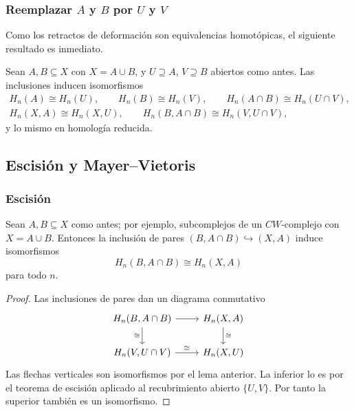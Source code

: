 \begin{frame}[allowframebreaks]
  \frametitle{Reemplazar $A$ y $B$ por $U$ y $V$}

  Como los retractos de deformación son equivalencias homotópicas, el siguiente resultado es inmediato.

  \begin{lemma}
    Sean $A,B\subseteq X$ con $X=A\cup B$, y $U\supseteq A$, $V\supseteq B$
    abiertos como antes. Las inclusiones inducen isomorfismos
    \begin{gather*}
      H_n(A)\cong H_n(U),\qquad H_n(B)\cong H_n(V),\qquad
      H_n(A\cap B)\cong H_n(U\cap V),\\
      H_n(X,A)\cong H_n(X,U),\qquad H_n(B,A\cap B)\cong H_n(V,U\cap V),
    \end{gather*}
    y lo mismo en homología reducida.
  \end{lemma}

\end{frame}

\subsection{Escisión y Mayer--Vietoris}

\begin{frame}[allowframebreaks]
  \frametitle{Escisión}

  \begin{theorem}
    Sean $A,B\subseteq X$ como antes; por ejemplo, subcomplejos de un
    $CW$-complejo con $X=A\cup B$. Entonces la inclusión de pares
    $(B,A\cap B)\hookrightarrow(X,A)$ induce isomorfismos
    \[
      H_n(B,A\cap B)\cong H_n(X,A)
    \]
    para todo $n$.
  \end{theorem}

  \framebreak

  \begin{proof}
    Las inclusiones de pares dan un diagrama conmutativo
    \[
      \begin{tikzcd}[ampersand replacement=\&]
        H_n(B,A\cap B)\arrow[r]\arrow{d}[swap]{\cong}
          \&H_n(X,A)\arrow{d}{\cong}\\
        H_n(V,U\cap V)\arrow{r}{\cong}\&H_n(X,U)
      \end{tikzcd}
    \]
    Las flechas verticales son isomorfismos por el lema anterior. La
    inferior lo es por el teorema de escisión aplicado al recubrimiento
    abierto $\{U,V\}$. Por tanto la
    superior también es un isomorfismo.
  \end{proof}
\end{frame}

